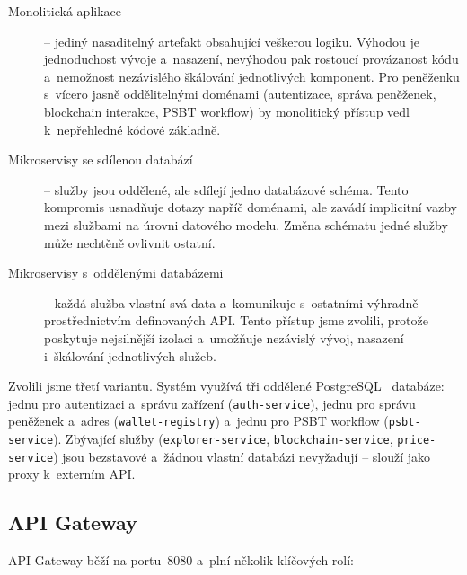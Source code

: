 \begin{description}
\item[Monolitická aplikace] -- jediný nasaditelný artefakt obsahující veškerou
  logiku. Výhodou je jednoduchost vývoje a~nasazení, nevýhodou pak rostoucí
  provázanost kódu a~nemožnost nezávislého škálování jednotlivých komponent.
  Pro peněženku s~vícero jasně oddělitelnými doménami (autentizace, správa peněženek,
  blockchain interakce, PSBT workflow) by monolitický přístup vedl
  k~nepřehledné kódové základně.

\item[Mikroservisy se sdílenou databází] -- služby jsou oddělené, ale sdílejí
  jedno databázové schéma. Tento kompromis usnadňuje dotazy napříč doménami,
  ale zavádí implicitní vazby mezi službami na úrovni datového modelu.
  Změna schématu jedné služby může nechtěně ovlivnit ostatní.

\item[Mikroservisy s~oddělenými databázemi] -- každá služba vlastní svá data
  a~komunikuje s~ostatními výhradně prostřednictvím definovaných API.
  Tento přístup jsme zvolili, protože poskytuje nejsilnější izolaci
  a~umožňuje nezávislý vývoj, nasazení i~škálování jednotlivých služeb.
\end{description}

Zvolili jsme třetí variantu. Systém využívá tři oddělené PostgreSQL~\cite{PostgreSQL} databáze:
jednu pro autentizaci a~správu zařízení (\texttt{auth-service}), jednu pro správu peněženek
a~adres (\texttt{wallet-registry}) a~jednu pro PSBT workflow
(\texttt{psbt-\allowbreak service}). Zbývající služby
(\texttt{explorer-\allowbreak service},
\texttt{blockchain-\allowbreak service},
\texttt{price-\allowbreak service}) jsou bezstavové a~žádnou vlastní
databázi nevyžadují -- slouží jako proxy k~externím API.

\subsection{API Gateway}

API Gateway běží na portu~8080 a~plní několik klíčových rolí:

